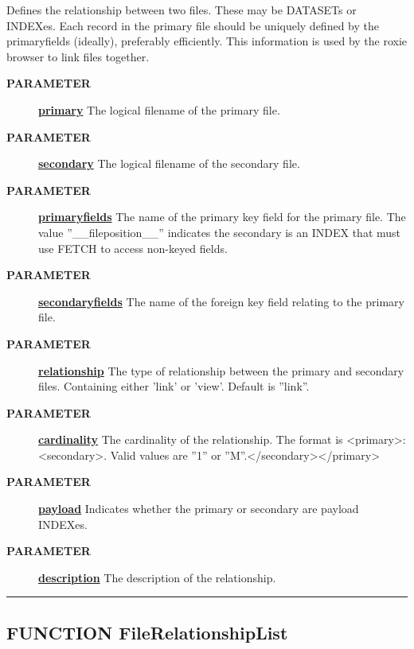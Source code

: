 \par
Defines the relationship between two files. These may be DATASETs or INDEXes. Each record in the primary file should be uniquely defined by the primaryfields (ideally), preferably efficiently. This information is used by the roxie browser to link files together.

\par
\begin{description}
\item [\colorbox{tagtype}{\color{white} \textbf{\textsf{PARAMETER}}}] \textbf{\underline{primary}} The logical filename of the primary file.
\item [\colorbox{tagtype}{\color{white} \textbf{\textsf{PARAMETER}}}] \textbf{\underline{secondary}} The logical filename of the secondary file.
\item [\colorbox{tagtype}{\color{white} \textbf{\textsf{PARAMETER}}}] \textbf{\underline{primaryfields}} The name of the primary key field for the primary file. The value ''\_\_fileposition\_\_'' indicates the secondary is an INDEX that must use FETCH to access non-keyed fields.
\item [\colorbox{tagtype}{\color{white} \textbf{\textsf{PARAMETER}}}] \textbf{\underline{secondaryfields}} The name of the foreign key field relating to the primary file.
\item [\colorbox{tagtype}{\color{white} \textbf{\textsf{PARAMETER}}}] \textbf{\underline{relationship}} The type of relationship between the primary and secondary files. Containing either 'link' or 'view'. Default is ''link''.
\item [\colorbox{tagtype}{\color{white} \textbf{\textsf{PARAMETER}}}] \textbf{\underline{cardinality}} The cardinality of the relationship. The format is <primary>:<secondary>. Valid values are ''1'' or ''M''.</secondary></primary>
\item [\colorbox{tagtype}{\color{white} \textbf{\textsf{PARAMETER}}}] \textbf{\underline{payload}} Indicates whether the primary or secondary are payload INDEXes.
\item [\colorbox{tagtype}{\color{white} \textbf{\textsf{PARAMETER}}}] \textbf{\underline{description}} The description of the relationship.
\end{description}

\rule{\linewidth}{0.5pt}
\subsection*{\textsf{\colorbox{headtoc}{\color{white} FUNCTION}
FileRelationshipList}}

